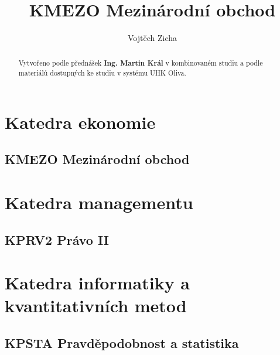 \documentclass[twoside,12pt]{report}
\title{KMEZO Mezinárodní obchod}
\author{Vojtěch Zicha}
\begin{document}
\maketitle%

\begin{abstract}
Vytvořeno podle přednášek \textbf{Ing. Martin Král} v kombinovaném studiu a podle materiálů dostupných ke studiu v systému UHK Oliva.
\end{abstract}

\tableofcontents
\clearpage

\part{Katedra ekonomie}
\chapter{KMEZO Mezinárodní obchod}


\part{Katedra managementu}
\chapter{KPRV2 Právo II}


\part{Katedra informatiky a kvantitativních metod}
\chapter{KPSTA Pravděpodobnost a statistika}

\end{document}
